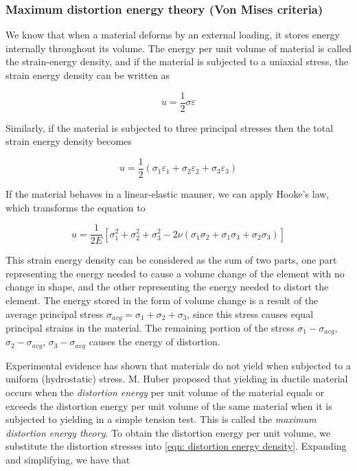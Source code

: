 \documentclass[a4paper,openany,nobib]{tufte-book}
\begin{document}
\subsubsection{Maximum distortion energy theory (Von Mises criteria)}
\label{maximum-distortion-energy-theory-von-mises-criteria}
We know that when a material deforms by an external loading, it stores
energy internally throughout its volume. The energy per unit volume of
material is called the strain-energy density, and if the material is
subjected to a uniaxial stress, the strain energy density can be written
as

$$u = \frac{1}{2}\sigma \varepsilon$$

Similarly, if the material is subjected to three principal stresses then
the total strain energy density becomes

$$u = \frac{1}{2}(\sigma_1\varepsilon_1 + \sigma_2\varepsilon_2 + \sigma_3\varepsilon_3)$$

If the material behaves in a linear-elastic manner, we can apply Hooke's
law, which transforms the equation to

$$ u = \frac{1}{2E}\left[\sigma_1^2 + \sigma_2^2 + \sigma_3^2 - 2\nu (\sigma_1\sigma_2 + \sigma_1\sigma_3 + \sigma_2\sigma_3)\right]$$

This strain energy density can be considered as the sum of two parts,
one part representing the energy needed to cause a volume change of the
element with no change in shape, and the other representing the energy
needed to distort the element. The energy stored in the form of volume
change is a result of the average principal stress
\(\sigma_{avg} = \sigma_1 + \sigma_2 + \sigma_3\), since this stress
causes equal principal strains in the material. The remaining portion of
the stress \(\sigma_1 - \sigma_{avg}\), \(\sigma_2 - \sigma_{avg}\),
\(\sigma_3 - \sigma_{avg}\) causes the energy of distortion.

Experimental evidence has shown that materials do not yield when
subjected to a uniform (hydrostatic) stress. M. Huber proposed that
yielding in ductile material occurs when the \emph{distortion energy} per
unit volume of the material equals or exceeds the distortion energy per
unit volume of the same material when it is subjected to yielding in a
simple tension test. This is called the \emph{maximum distortion energy
theory}. To obtain the distortion energy per unit volume, we substitute
the distortion stresses into
\ref{eqn: distortion energy density}.
Expanding and simplifying, we have that
\end{document}
